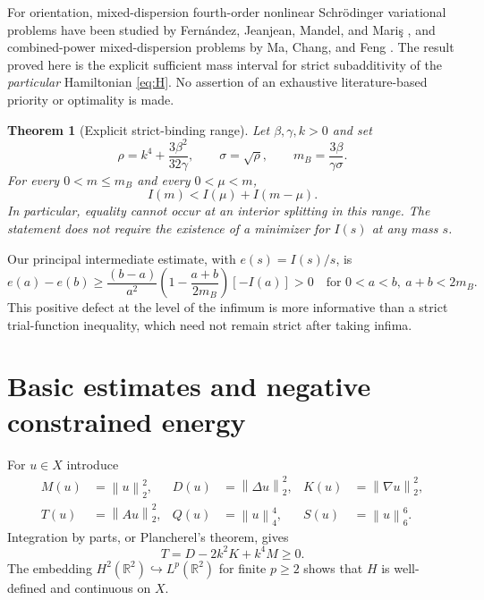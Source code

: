 \documentclass[11pt,letterpaper]{article}
\numberwithin{equation}{section}
\newtheorem{theorem}{Theorem}[section]
\newcommand{\RR}{\mathbb R}
\newcommand{\norm}[1]{\left\lVert #1\right\rVert}
\begin{document}
For orientation, mixed-dispersion fourth-order nonlinear Schr\"odinger variational problems have been studied by Fern\'andez, Jeanjean, Mandel, and Mari\c{s} \cite{FJMM2022}, and combined-power mixed-dispersion problems by Ma, Chang, and Feng \cite{MCF2024}. The result proved here is the explicit sufficient mass interval for strict subadditivity of the \emph{particular} Hamiltonian \eqref{eq:H}. No assertion of an exhaustive literature-based priority or optimality is made.

\begin{theorem}[Explicit strict-binding range]\label{thm:main}
Let $\beta,\gamma,k>0$ and set
\begin{equation}\label{eq:mB}
 \rho=k^4+\frac{3\beta^2}{32\gamma},\qquad
 \sigma=\sqrt{\rho},\qquad
 m_B=\frac{3\beta}{\gamma\sigma}.
\end{equation}
For every $0<m\le m_B$ and every $0<\mu<m$,
\begin{equation}\label{eq:strict}
  \boxed{\ I(m)<I(\mu)+I(m-\mu).\ }
\end{equation}
In particular, equality cannot occur at an interior splitting in this range. The statement does not require the existence of a minimizer for $I(s)$ at any mass $s$.
\end{theorem}

Our principal intermediate estimate, with $e(s)=I(s)/s$, is
\begin{equation}\label{eq:gap-intro}
 e(a)-e(b)\ge
 \frac{(b-a)}{a^2}
 \left(1-\frac{a+b}{2m_B}\right)[-I(a)]>0
 \quad\text{for }0<a<b,\ a+b<2m_B.
\end{equation}
This positive defect at the level of the infimum is more informative than a strict trial-function inequality, which need not remain strict after taking infima.

\section{Basic estimates and negative constrained energy}

For $u\in X$ introduce
\[
 \begin{aligned}
 M(u)&=\norm{u}_2^2,&D(u)&=\norm{\Delta u}_2^2,&
 K(u)&=\norm{\nabla u}_2^2,\\
 T(u)&=\norm{Au}_2^2,&Q(u)&=\norm{u}_4^4,&
 S(u)&=\norm{u}_6^6.
 \end{aligned}
\]
Integration by parts, or Plancherel's theorem, gives
\begin{equation}\label{eq:expand}
 T=D-2k^2K+k^4M\ge0.
\end{equation}
The embedding $H^2(\RR^2)\hookrightarrow L^p(\RR^2)$ for finite $p\ge2$ shows that $H$ is well-defined and continuous on $X$.
\end{document}
